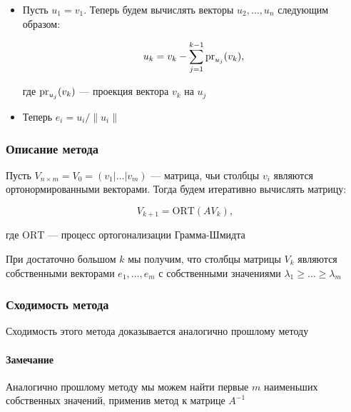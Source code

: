 \begin{itemize}
    \item Пусть $u_1 = v_1$. Теперь будем вычислять векторы $u_2, \ldots, u_n$ следующим образом:

    \[
    u_k = v_k - \sum\limits_{j = 1}^{k-1} \operatorname{pr}_{u_j} (v_k),
    \]

    где $\operatorname{pr}_{u_j} (v_k)$ --- проекция вектора $v_k$ на $u_j$

    \item Теперь $e_i = u_i / \lVert u_i \rVert$
\end{itemize}

\subsubsection*{Описание метода}

Пусть $V_{n \times m} = V_0 = (v_1 | \ldots | v_m)$ --- матрица, чьи столбцы $v_i$ являются ортонормированными векторами. Тогда будем итеративно вычислять матрицу:

\[
V_{k+1} = \mathrm{ORT}(A V_k),
\]

где $\mathrm{ORT}$ --- процесс ортогонализации Грамма-Шмидта

При достаточно большом $k$ мы получим, что столбцы матрицы $V_k$ являются собственными векторами $e_1, \ldots, e_m$ с собственными значениями $\lambda_1 \geqslant \ldots \geqslant \lambda_m$

\subsubsection*{Сходимость метода}

Сходимость этого метода доказывается аналогично прошлому методу

\paragraph{Замечание} Аналогично прошлому методу мы можем найти первые $m$ наименьших собственных значений, применив метод к матрице $A^{-1}$
